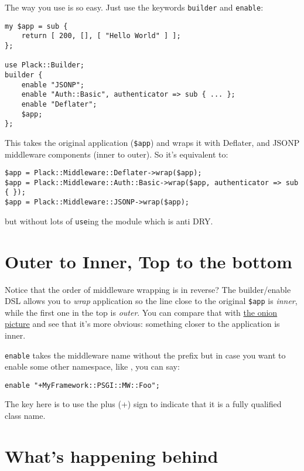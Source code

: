 The way you use  is so easy. Just use the keywords
\lstinline!builder! and \lstinline!enable!:

\begin{lstlisting}
my $app = sub { 
    return [ 200, [], [ "Hello World" ] ];
};

use Plack::Builder;
builder {
    enable "JSONP";
    enable "Auth::Basic", authenticator => sub { ... };
    enable "Deflater";
    $app;
};
\end{lstlisting}

This takes the original application (\lstinline!$app!) and wraps it with
Deflater,  and JSONP middleware components (inner to outer).
So it's equivalent to:

\begin{lstlisting}
$app = Plack::Middleware::Deflater->wrap($app);
$app = Plack::Middleware::Auth::Basic->wrap($app, authenticator => sub { });
$app = Plack::Middleware::JSONP->wrap($app);
\end{lstlisting}
%
but without lots of \lstinline!use!ing the module which is anti DRY.

\section{Outer to Inner, Top to the
bottom}\label{outer-to-inner-top-to-the-bottom}

Notice that the order of middleware wrapping is in reverse? The
builder/enable DSL allows you to \emph{wrap} application so the line
close to the original \lstinline!$app! is \emph{inner}, while the first
one in the top is \emph{outer}. You can compare that with
\href{http://pylonshq.com/docs/en/0.9.7/_images/pylons_as_onion.png}{the
onion picture} and see that it's more obvious: something closer to the
application is inner.

\lstinline!enable! takes the middleware name without the
 prefix but in case you want to enable some other
namespace, like , you can say:

\begin{lstlisting}
enable "+MyFramework::PSGI::MW::Foo";
\end{lstlisting}

The key here is to use the plus (+) sign to indicate that it is a fully
qualified class name.

\section{What's happening behind}\label{whats-happening-behind}

